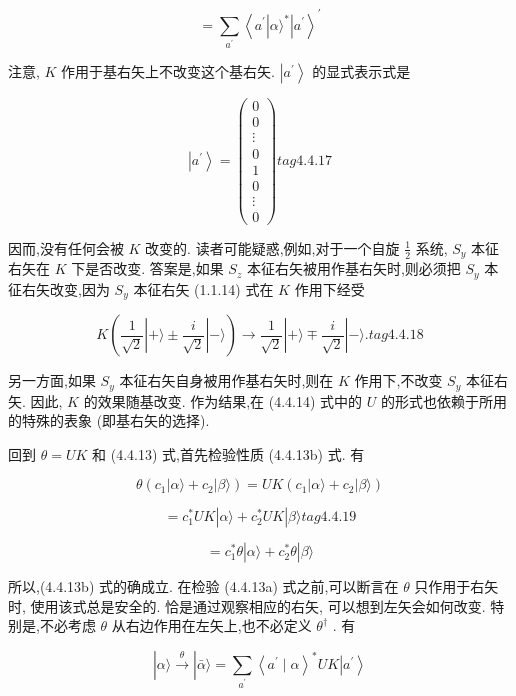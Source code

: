 $$
= \mathop{\sum }\limits_{{a}^{\prime }}{\left\langle {a}^{\prime }\left| \alpha {\rangle }^{ * }\right| {a}^{\prime }\right\rangle }^{\prime }
$$

注意, $K$ 作用于基右矢上不改变这个基右矢. $\left| {a}^{\prime }\right\rangle$ 的显式表示式是

$$
\left| {a}^{\prime }\right\rangle = \left( \begin{matrix} 0 \\ 0 \\ \vdots \\ 0 \\ 1 \\ 0 \\ \vdots \\ 0 \end{matrix}\right) tag{4. 4.17}
$$

因而,没有任何会被 $K$ 改变的. 读者可能疑惑,例如,对于一个自旋 $\frac{1}{2}$ 系统, ${S}_{y}$ 本征右矢在 $K$ 下是否改变. 答案是,如果 ${S}_{z}$ 本征右矢被用作基右矢时,则必须把 ${S}_{y}$ 本征右矢改变,因为 ${S}_{y}$ 本征右矢 (1.1.14) 式在 $K$ 作用下经受

$$
K\left( {\frac{1}{\sqrt{2}}\left| {+\rangle \pm \frac{i}{\sqrt{2}}}\right| - \rangle }\right) \rightarrow \frac{1}{\sqrt{2}}\left| {+\rangle \mp \frac{i}{\sqrt{2}}}\right| - \rangle . tag{4. 4.18}
$$

另一方面,如果 ${S}_{y}$ 本征右矢自身被用作基右矢时,则在 $K$ 作用下,不改变 ${S}_{y}$ 本征右矢. 因此, $K$ 的效果随基改变. 作为结果,在 (4.4.14) 式中的 $U$ 的形式也依赖于所用的特殊的表象 (即基右矢的选择).

回到 $\theta = {UK}$ 和 (4.4.13) 式,首先检验性质 (4.4.13b) 式. 有

$$
\theta \left( {{c}_{1}\left| {\alpha \rangle + {c}_{2}}\right| \beta \rangle }\right) = {UK}\left( {{c}_{1}\left| {\alpha \rangle + {c}_{2}}\right| \beta \rangle }\right)
$$

$$
= {c}_{1}^{ * }{UK}\left| {\alpha \rangle + {c}_{2}^{ * }{UK}}\right| \beta \rangle tag{4. 4.19}
$$

$$
= {c}_{1}^{ * }\theta \left| {\alpha \rangle + {c}_{2}^{ * }\theta }\right| \beta \rangle
$$

所以,(4.4.13b) 式的确成立. 在检验 (4.4.13a) 式之前,可以断言在 $\theta$ 只作用于右矢时, 使用该式总是安全的. 恰是通过观察相应的右矢, 可以想到左矢会如何改变. 特别是,不必考虑 $\theta$ 从右边作用在左矢上,也不必定义 ${\theta }^{ \dagger }$ . 有

$$
\left| {\alpha \rangle \overset{\theta }{ \rightarrow }}\right| \bar{\alpha }\rangle = \mathop{\sum }\limits_{{a}^{\prime }}{\left\langle {a}^{\prime } \mid \alpha \right\rangle }^{ * }{UK}\left| {a}^{\prime }\right\rangle
$$

